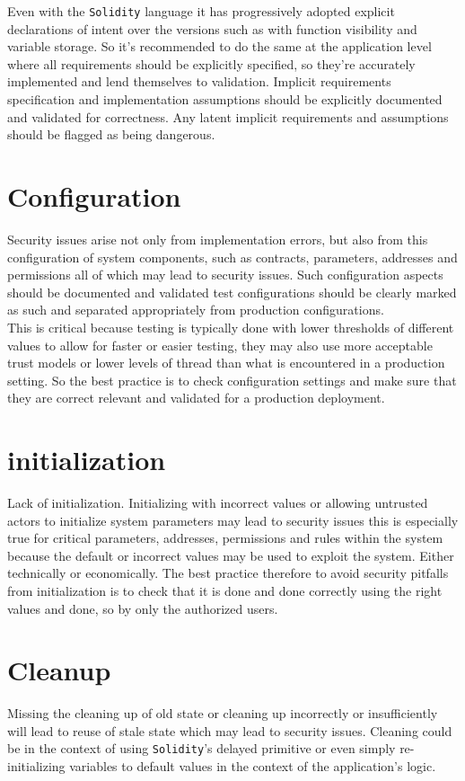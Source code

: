 Even with the \verb|Solidity| language it has progressively adopted explicit declarations of intent over the versions such as with function visibility and variable storage. So it's recommended to do the same at the application level where all requirements should be explicitly specified, so they're accurately implemented and lend themselves to validation. Implicit requirements specification and implementation assumptions should be explicitly documented and validated for correctness. Any latent implicit requirements and assumptions should be flagged as being dangerous.

\section{Configuration}
Security issues arise not only from implementation errors, but also from this configuration of system components, such as contracts, parameters, addresses and permissions all of which may lead to security issues. Such configuration aspects should be documented and validated test configurations should be clearly marked as such and separated appropriately from production configurations.\\ 

This is critical because testing is typically done with lower thresholds of different values to allow for faster or easier testing, they may also use more acceptable trust models or lower levels of thread than what is encountered in a production setting. So the best practice is to check configuration settings and make sure that they are correct relevant and validated for a production deployment.

\section{initialization}
Lack of initialization. Initializing with incorrect values or allowing untrusted actors to initialize system parameters may lead to security issues this is especially true for critical parameters, addresses, permissions and rules within the system because the default or incorrect values may be used to exploit the system. Either technically or economically. The best practice therefore to avoid security pitfalls from initialization is to check that it is done and done correctly using the right values and done, so by only the authorized users.

\section{Cleanup}
Missing the cleaning up of old state or cleaning up incorrectly or insufficiently will lead to reuse of stale state which may lead to security issues. Cleaning could be in the context of using \verb|Solidity|'s delayed primitive or even simply re-initializing variables to default values in the context of the application's logic.\\

